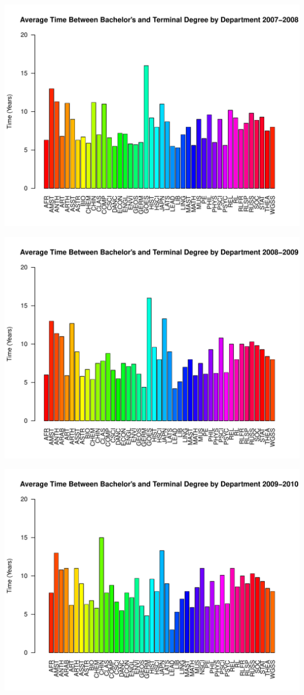 \documentclass[12pt,a4paper]{article}\usepackage[]{graphicx}\usepackage[]{color}
\makeatletter
\def\maxwidth{ %
  \ifdim\Gin@nat@width>\linewidth
    \linewidth
  \else
    \Gin@nat@width
  \fi
}
\newenvironment{knitrout}{}{} %
\theoremstyle{definition}
\makeatother
\begin{document}
\begin{knitrout}
\includegraphics[width=\maxwidth]{figure/unnamed-chunk-13-4} 

\includegraphics[width=\maxwidth]{figure/unnamed-chunk-13-5} 

\includegraphics[width=\maxwidth]{figure/unnamed-chunk-13-6} 


\end{knitrout}
\end{document}
